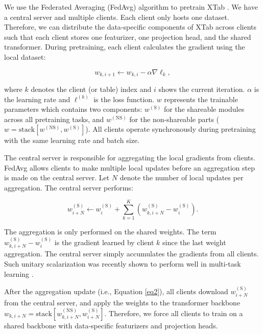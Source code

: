 We use the Federated Averaging (FedAvg) algorithm to pretrain XTab \citep{mcmahan2017communication, li2019convergence}. We have a central server and multiple clients. Each client only hosts one dataset. Therefore, we can distribute the data-specific components of XTab across clients such that each client stores one featurizer, one projection head, and the shared transformer. During pretraining, each client calculates the gradient using the local dataset:

\begin{equation}
\label{eq1}
    w_{k, i+1} \leftarrow w_{k, i}- \alpha \nabla \ell_{k},
\end{equation}

 where $k$ denotes the client (or table) index and $i$ shows the current iteration. $\alpha$ is the learning rate and $\ell^{(k)}$ is the loss function. $w$ represents the trainable parameters which contains two components: $w^{(\text{S})}$ for the shareable modules across all pretraining tasks, and $w^{(\text{NS})}$ for the non-shareable parts ($w  = \text{stack}[w^{(\text{NS})}, w^{(\text{S})}]$). All clients operate synchronously during pretraining with the same learning rate and batch size. 

The central server is responsible for aggregating the local gradients from clients. FedAvg allows clients to make multiple local updates before an aggregation step is made on the central server. Let $N$ denote the number of local updates per aggregation. The central server performs:

\begin{equation}
\label{eq2}
    w^{(\text{S})}_{i+N} \leftarrow w^{(\text{S})}_{i} +  \sum_{k=1}^K (w^{(\text{S})}_{k, i+N} - w^{(\text{S})}_{i}).
\end{equation}

The aggregation is only performed on the shared weights. The term $w^{(\text{S})}_{k, i+N} - w^{(\text{S})}_{i}$ is the gradient learned by client $k$ since the last weight aggregation. The central server simply accumulates the gradients from all clients. Such unitary scalarization was recently shown to perform well in multi-task learning \citep{kurin2022defense}. 

After the aggregation update (i.e., Equation \ref{eq2}), all clients download $w^{(\text{S})}_{i+N}$ from the central server, and apply the weights to the transformer backbone $w_{k, i+N}  = \text{stack}[w_{k, i+N}^{(\text{NS})}, w^{(\text{S})}_{i+N}]$. Therefore, we force all clients to train on a shared backbone with data-specific featurizers and projection heads.

